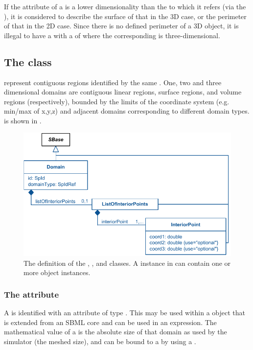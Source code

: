 If the  attribute of a \DomainType is a lower dimensionality than the \Geometry to which it refers (via the \Domain), it is considered to describe the surface of that \Geometry in the 3D case, or the perimeter of that \Geometry in the 2D case.  Since there is no defined perimeter of a 3D object, it is illegal to have a \DomainType with a  of  where the corresponding \Geometry is three-dimensional.


\subsection{The  class}
\label{domain-class}
\label{listofinteriorpoints-class}
\Domains represent contiguous regions identified by the same \DomainType.  One, two and three dimensional domains are contiguous linear regions, surface regions, and volume regions (respectively), bounded by the limits of the coordinate system (e.g. min/max of x,y,z) and adjacent domains corresponding to different domain types.  \Domain is shown in .
 
\begin{figure}[ht]
  \includegraphics{figs/Domain-uml}
  \caption{The definition of the \Domain, \ListOfInteriorPoints, and \InteriorPoint classes.  A \ListOfDomains instance in \Geometry can contain one or more \Domain object instances.}
  \label{Domain-uml}
  \label{InteriorPoint-uml}
  \label{ListOfInteriorPoints-uml}
\end{figure}

\subsubsection{The \fixttspace{} attribute}
A \Domain is identified with an  attribute of type .  This  may be used within a \SpatialSymbolReference object that is extended from an SBML core \Parameter and can be used in an expression.  The mathematical value of a \Domain is the absolute size of that domain as used by the simulator (the meshed size), and can be bound to a \Parameter by using a \SpatialSymbolReference.

